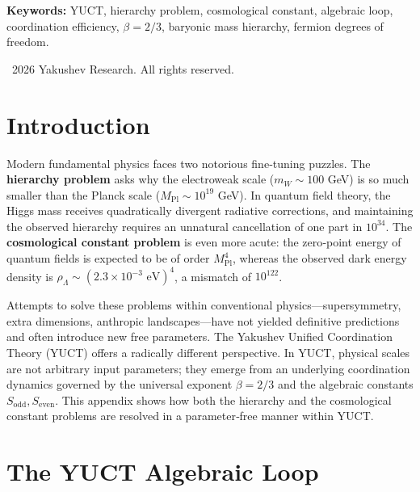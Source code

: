 \documentclass[12pt,a4paper]{article}
\begin{document}
	\vspace{1em}
	\noindent\textbf{Keywords:} YUCT, hierarchy problem, cosmological constant, algebraic loop, coordination efficiency, $\beta = 2/3$, baryonic mass hierarchy, fermion degrees of freedom.
	
	\vspace{1em}
	\noindent\textcopyright\ 2026 Yakushev Research. All rights reserved.
	
	\newpage
	\tableofcontents
	\newpage
	
	\section{Introduction}
	
	Modern fundamental physics faces two notorious fine‑tuning puzzles. The \textbf{hierarchy problem} asks why the electroweak scale ($m_W \sim 100$ GeV) is so much smaller than the Planck scale ($M_{\mathrm{Pl}} \sim 10^{19}$ GeV). In quantum field theory, the Higgs mass receives quadratically divergent radiative corrections, and maintaining the observed hierarchy requires an unnatural cancellation of one part in $10^{34}$. The \textbf{cosmological constant problem} is even more acute: the zero‑point energy of quantum fields is expected to be of order $M_{\mathrm{Pl}}^4$, whereas the observed dark energy density is $\rho_\Lambda \sim (2.3 \times 10^{-3} \text{ eV})^4$, a mismatch of $10^{122}$.
	
	Attempts to solve these problems within conventional physics—supersymmetry, extra dimensions, anthropic landscapes—have not yielded definitive predictions and often introduce new free parameters. The Yakushev Unified Coordination Theory (YUCT) offers a radically different perspective. In YUCT, physical scales are not arbitrary input parameters; they emerge from an underlying coordination dynamics governed by the universal exponent $\beta = 2/3$ and the algebraic constants $S_{\mathrm{odd}}, S_{\mathrm{even}}$. This appendix shows how both the hierarchy and the cosmological constant problems are resolved in a parameter‑free manner within YUCT.
	
	\section{The YUCT Algebraic Loop}
	
\end{document}
